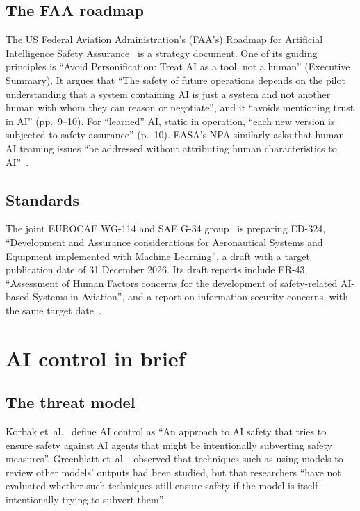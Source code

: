 \documentclass[11pt]{article}
\begin{document}
\subsection{The FAA roadmap}\label{sec:faa}

The US Federal Aviation Administration's (FAA's) Roadmap for Artificial Intelligence Safety Assurance~\cite{faa2024roadmap} is a strategy document. One of its guiding principles is ``Avoid Personification: Treat AI as a tool, not a human'' (Executive Summary). It argues that ``The safety of future operations depends on the pilot understanding that a system containing AI is just a system and not another human with whom they can reason or negotiate'', and it ``avoids mentioning trust in AI'' (pp.~9--10). For ``learned'' AI, static in operation, ``each new version is subjected to safety assurance'' (p.~10). EASA's NPA similarly asks that human--AI teaming issues ``be addressed without attributing human characteristics to AI''~\cite[Section~2.1.1]{easa2025npaA}.

\subsection{Standards}\label{sec:standards}

The joint EUROCAE WG-114 and SAE G-34 group~\cite[Section~B]{easa2026concept} is preparing ED-324, ``Development and Assurance considerations for Aeronautical Systems and Equipment implemented with Machine Learning'', a draft with a target publication date of 31 December 2026. Its draft reports include ER-43, ``Assessment of Human Factors concerns for the development of safety-related AI-based Systems in Aviation'', and a report on information security concerns, with the same target date~\cite{eurocaewg114}.

\section{AI control in brief}\label{sec:control}

\subsection{The threat model}\label{sec:threatmodel}

Korbak et~al.~\cite[Table~1]{korbak2025sketch} define AI control as ``An approach to AI safety that tries to ensure safety against AI agents that might be intentionally subverting safety measures''. Greenblatt et~al.~\cite{greenblatt2023control} observed that techniques such as using models to review other models' outputs had been studied, but that researchers ``have not evaluated whether such techniques still ensure safety if the model is itself intentionally trying to subvert them''.
\end{document}
